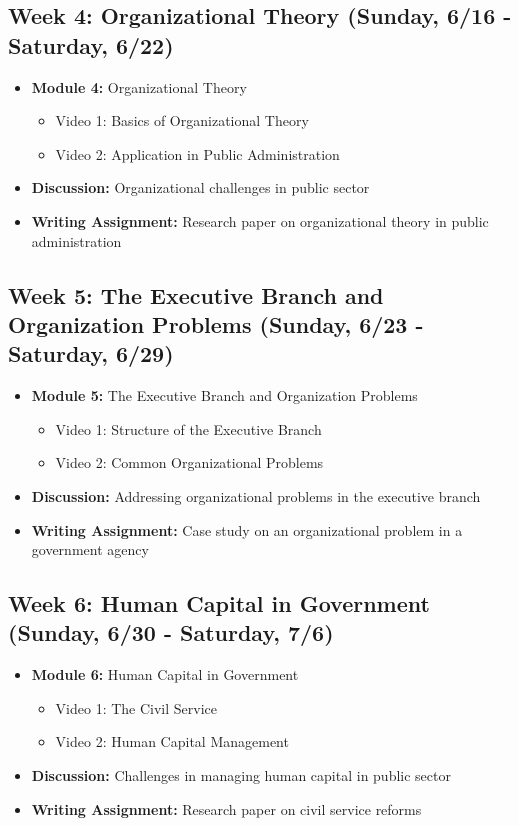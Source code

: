 \documentclass[12pt, letterpaper]{article}
\begin{document}
\subsection*{Week 4: Organizational Theory (Sunday, 6/16 - Saturday, 6/22)}
\begin{itemize}
    \item \textbf{Module 4:} Organizational Theory
    \begin{itemize}
        \item Video 1: Basics of Organizational Theory
        \item Video 2: Application in Public Administration
    \end{itemize}
    \item \textbf{Discussion:} Organizational challenges in public sector
    \item \textbf{Writing Assignment:} Research paper on organizational theory in public administration
\end{itemize}

\subsection*{Week 5: The Executive Branch and Organization Problems (Sunday, 6/23 - Saturday, 6/29)}
\begin{itemize}
    \item \textbf{Module 5:} The Executive Branch and Organization Problems
    \begin{itemize}
        \item Video 1: Structure of the Executive Branch
        \item Video 2: Common Organizational Problems
    \end{itemize}
    \item \textbf{Discussion:} Addressing organizational problems in the executive branch
    \item \textbf{Writing Assignment:} Case study on an organizational problem in a government agency
\end{itemize}

\subsection*{Week 6: Human Capital in Government (Sunday, 6/30 - Saturday, 7/6)}
\begin{itemize}
    \item \textbf{Module 6:} Human Capital in Government
    \begin{itemize}
        \item Video 1: The Civil Service
        \item Video 2: Human Capital Management
    \end{itemize}
    \item \textbf{Discussion:} Challenges in managing human capital in public sector
    \item \textbf{Writing Assignment:} Research paper on civil service reforms
\end{itemize}
\end{document}
